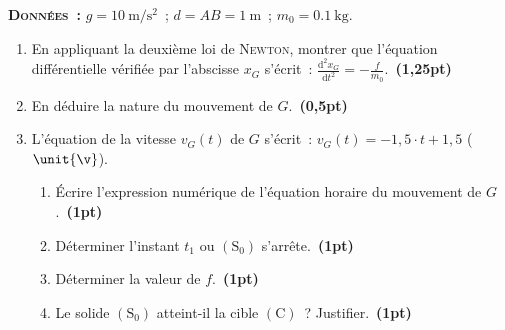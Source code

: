 \textbf{\textsc{Données~:}}
$g=\qty{10}{\m\per\square\s}$~; $d=AB=\qty{1}{\m}$~; $m_{0}=\qty{0.1}{\kg}$.

\begin{enumerate}
    \item En appliquant la deuxième loi de \textsc{Newton}, montrer que
          l'équation différentielle vérifiée par l'abscisse $x_{G}$ s'écrit~:
          $\frac{\mathrm{d}^{2}x_{G}}{\mathrm{d}t^{2}}=-\frac{f}{m_{0}}$.~\textbf{(1,25pt)}
    \item En déduire la nature du mouvement de $G$.~\textbf{(0,5pt)}
    \item L'équation de la vitesse $v_{G}(t)$ de $G$ s'écrit~:
          $v_{G}(t)=-1,5\cdot t+1,5$ ($\unit{\v}$).
          \begin{enumerate}
              \item Écrire l'expression numérique de l'équation horaire du
                    mouvement de $G$.~\textbf{(1pt)}
              \item Déterminer l'instant $t_{1}$ ou $\mathrm{(S_{0})}$
                    s'arrête.~\textbf{(1pt)}
              \item Déterminer la valeur de $f$.~\textbf{(1pt)}
              \item Le solide $\mathrm{(S_{0})}$ atteint-il la cible
                    $\mathrm{(C)}$~? Justifier.~\textbf{(1pt)}
          \end{enumerate}
\end{enumerate}

